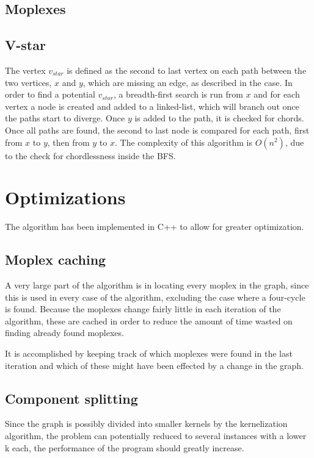 \documentclass{article}
\begin{document}
		\subsection{Moplexes}

		\subsection{V-star}
		The vertex $v_{star}$ is defined as the second to last vertex on each path between the two vertices, $x$ and $y$, which are missing an edge, as described in the case.
		In order to find a potential $v_{star}$, a breadth-first search is run from $x$ and for each vertex a node is created and added to a linked-list, which will branch out once the paths start to diverge.
		Once $y$ is added to the path, it is checked for chords.
		Once all paths are found, the second to last node is compared for each path, first from $x$ to $y$, then from $y$ to $x$.
		The complexity of this algorithm is $O(n^2)$, due to the check for chordlessness inside the BFS.

	\section{Optimizations}
	The algorithm has been implemented in C++ to allow for greater optimization.

		\subsection{Moplex caching}
		A very large part of the algorithm is in locating every moplex in the graph, since this is used in every case of the algorithm, excluding the case where a four-cycle is found.
		Because the moplexes change fairly little in each iteration of the algorithm, these are cached in order to reduce the amount of time wasted on finding already found moplexes.

		It is accomplished by keeping track of which moplexes were found in the last iteration and which of these might have been effected by a change in the graph.

		\subsection{Component splitting}
		Since the graph is possibly divided into smaller kernels by the kernelization algorithm, the problem can potentially reduced to several instances with a lower k each, the performance of the program should greatly increase.
\end{document}
